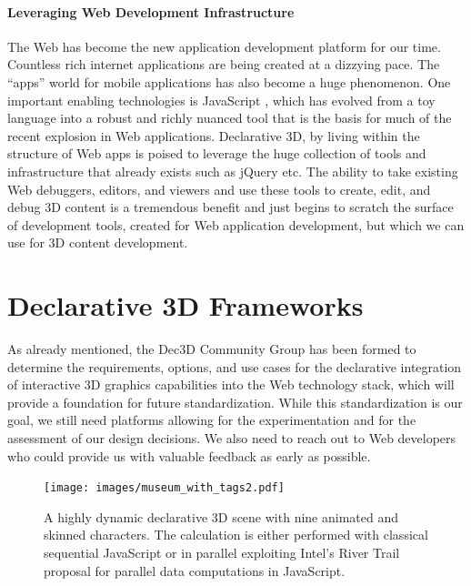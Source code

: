 \documentclass{acmsiggraph}
\begin{document}
\paragraph{Leveraging Web Development Infrastructure}
The Web has become the new application development platform for our time. Countless rich internet applications are being created at a dizzying pace. The ``apps'' world for mobile applications has also become a huge phenomenon. One important enabling technologies is JavaScript \cite{Crockford08}, which has evolved from a toy language into a robust and richly nuanced tool that is the basis for much of the recent explosion in Web applications.
Declarative 3D, by living within the structure of Web apps is poised to leverage the huge collection of tools and infrastructure that already exists such as jQuery \cite{jquery} etc. The ability to take existing Web debuggers, editors, and viewers and use these tools to create, edit, and debug 3D content is a tremendous benefit and just begins to scratch the surface of development tools, created for Web application development, but which we can use for 3D content development.



\section{Declarative 3D Frameworks}
\label{sec:Frameworks}

As already mentioned, the Dec3D Community Group \cite{Dec3D} has been formed to determine the requirements, options, and use cases for the declarative integration of interactive 3D graphics capabilities into the Web technology stack, which will provide a foundation for future standardization. While this standardization is our goal, we still need platforms allowing for the experimentation and for the assessment of our design decisions. We also need to reach out to Web developers who could provide us with valuable feedback as early as possible.

\begin{figure}
  \centering
  \texttt{[image: images/museum\_with\_tags2.pdf]}
  \caption{A highly dynamic declarative 3D scene with nine animated and skinned characters. The calculation is either performed with classical sequential JavaScript or in parallel exploiting Intel's River Trail proposal for parallel data computations in JavaScript.}
  \label{fig:xflow}
  \vspace{-0.2cm}
\end{figure}
\end{document}

